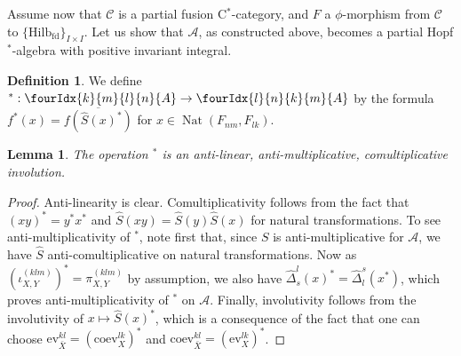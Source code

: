 \documentclass[10pt]{article}
\DeclareMathOperator{\fin}{\mathrm{fd}}
\DeclareMathOperator{\Nat}{\mathrm{Nat}}
\newcommand{\CatCC}{\mathscr{C}}
\newcommand{\Hilb}{\mathrm{Hilb}}
\newcommand{\ev}{\mathrm{ev}}
\newcommand{\coev}{\mathrm{coev}}
\newcommand{\Gr}[5]{\fourIdx{#2}{#4}{#3}{#5}{#1}}%
\newtheorem{Lem}[Theorem]{Lemma}
\theoremstyle{definition}
\newtheorem{Def}[Theorem]{Definition}
\numberwithin{equation}{section}
\begin{document}
Assume now that $\CatCC$ is a partial fusion C$^*$-category, and $F$ a $\phi$-morphism from $\CatCC$ to $\{\Hilb_{\fin}\}_{I\times I}$. Let us show that $\mathscr{A}$, as constructed above, becomes a partial Hopf $^*$-algebra with positive invariant integral.

\begin{Def} We define $^*: \Gr{A}{k}{l}{m}{n}\rightarrow \Gr{A}{l}{k}{n}{m}$ by the formula $f^*(x) = \overline{f(\hat{S}(x)^*)}$ for $x\in \Nat(F_{nm},F_{lk}).$
\end{Def}

\begin{Lem} The operation $^*$ is an anti-linear, anti-multiplicative, comultiplicative involution.
\end{Lem}

\begin{proof} Anti-linearity is clear. Comultiplicativity follows from the fact that $(xy)^* = y^*x^*$ and $\hat{S}(xy) = \hat{S}(y)\hat{S}(x)$ for natural transformations. To see anti-multiplicativity of $^*$, note first that, since $S$ is anti-multiplicative for $\mathscr{A}$, we have $\hat{S}$ anti-comultiplicative on natural transformations. Now as $(\iota_{X,Y}^{(klm)})^* = \pi_{X,Y}^{(klm)}$ by assumption, we also have $\hat{\Delta}^l_s(x)^* = \hat{\Delta}^s_l(x^*)$, which proves anti-multiplicativity of $^*$ on $\mathscr{A}$.  Finally, involutivity follows from the involutivity of $x\mapsto \hat{S}(x)^*$, which is a consequence of the fact that one can choose $\ev_{\bar{X}}^{kl} = (\coev_{X}^{lk})^*$ and $\coev_{\bar{X}}^{kl} = (\ev_X^{lk})^*$.
\end{proof}
\end{document}
